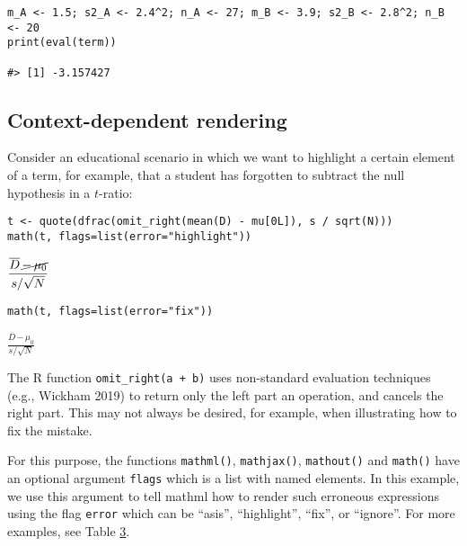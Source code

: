 \begin{verbatim}
m_A <- 1.5; s2_A <- 2.4^2; n_A <- 27; m_B <- 3.9; s2_B <- 2.8^2; n_B <- 20
print(eval(term))

#> [1] -3.157427
\end{verbatim}

\hypertarget{context-dependent-rendering}{%
\subsection{Context-dependent rendering}\label{context-dependent-rendering}}

Consider an educational scenario in which we want to highlight a certain
element of a term, for example, that a student has forgotten to subtract
the null hypothesis in a \(t\)-ratio:

\begin{verbatim}
t <- quote(dfrac(omit_right(mean(D) - mu[0L]), s / sqrt(N)))
math(t, flags=list(error="highlight"))
\end{verbatim}

\(\displaystyle{\frac{{\overline{D}}{{\,}{\cancel{{-}{{\,}{{\mu}_{0}}}}}}}{{s}{/}{\sqrt{N}}}}\)

\begin{verbatim}
math(t, flags=list(error="fix"))
\end{verbatim}

\(\displaystyle{\frac{{\overline{D}}{{\,}{\boxed{{-}{{\,}{{\mu}_{0}}}}}}}{{s}{/}{\sqrt{N}}}}\)

The R function \texttt{omit\_right(a~+~b)} uses non-standard evaluation
techniques (e.g., Wickham 2019) to return only the left part an
operation, and cancels the right part. This may not always be desired,
for example, when illustrating how to fix the mistake.

For this purpose, the functions \texttt{mathml()}, \texttt{mathjax()}, \texttt{mathout()} and
\texttt{math()} have an optional argument \texttt{flags} which is a list with named
elements. In this example, we use this argument to tell mathml how to
render such erroneous expressions using the flag \texttt{error} which can be
``asis'', ``highlight'', ``fix'', or ``ignore''. For more examples, see Table
\protect\hyperlink{tab:mistakes}{3}.

